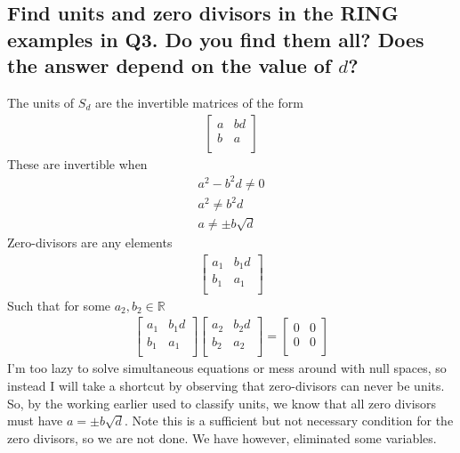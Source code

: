 \documentclass{article}
\begin{document}
\subsection*{Find units and zero divisors in the RING examples in Q3. Do you find them all? Does the answer depend on the value of \(d\)?}
\solution
The units of \(S_d\) are the invertible matrices of the form
\begin{align*}
\left[ {\begin{array}{cc}
   a & bd \\
   b & a \\
  \end{array} } \right]
\end{align*}
These are invertible when
\begin{align*}
a^2 - b^2 d \neq 0\\
a^2 \neq b^2 d\\
a \neq \pm b\sqrt{d}
\end{align*}
Zero-divisors are any elements
\begin{align*}
\left[ {\begin{array}{cc}
   a_1 & b_1 d \\
   b_1 & a_1 \\
  \end{array} } \right]
\end{align*}
Such that for some \(a_2, b_2 \in \mathds{R}\)
\begin{align*}
\left[ {\begin{array}{cc}
   a_1 & b_1 d \\
   b_1 & a_1 \\
  \end{array} } \right] 
  \left[ {\begin{array}{cc}
   a_2 & b_2 d \\
   b_2 & a_2 \\
  \end{array} } \right] = 
  \left[ {\begin{array}{cc}
   0 & 0 \\
   0 & 0 \\
  \end{array} } \right]
\end{align*}
I'm too lazy to solve simultaneous equations or mess around with null spaces, so instead I will take a shortcut by observing that zero-divisors can never be units. So, by the working earlier used to classify units, we know that all zero divisors must have \(a = \pm b\sqrt{d}\). Note this is a sufficient but not necessary condition for the zero divisors, so we are not done. We have however, eliminated some variables.
\end{document}
